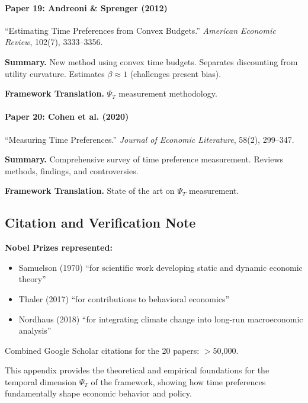 \paragraph{Paper 19: Andreoni \& Sprenger (2012)}

``Estimating Time Preferences from Convex Budgets.''
\textit{American Economic Review}, 102(7), 3333--3356.

\textbf{Summary.}
New method using convex time budgets. Separates discounting from 
utility curvature. Estimates $\beta \approx 1$ (challenges present bias).

\textbf{Framework Translation.}
$\Psi_T$ measurement methodology.

\paragraph{Paper 20: Cohen et al. (2020)}

``Measuring Time Preferences.''
\textit{Journal of Economic Literature}, 58(2), 299--347.

\textbf{Summary.}
Comprehensive survey of time preference measurement.
Reviews methods, findings, and controversies.

\textbf{Framework Translation.}
State of the art on $\Psi_T$ measurement.

\subsection{Citation and Verification Note}

\textbf{Nobel Prizes represented:}
\begin{itemize}
    \item Samuelson (1970) ``for scientific work developing static and dynamic economic theory''
    \item Thaler (2017) ``for contributions to behavioral economics''
    \item Nordhaus (2018) ``for integrating climate change into long-run macroeconomic analysis''
\end{itemize}

Combined Google Scholar citations for the 20 papers: $>$50,000.

This appendix provides the theoretical and empirical foundations for the 
temporal dimension $\Psi_T$ of the framework, showing how time preferences 
fundamentally shape economic behavior and policy.

